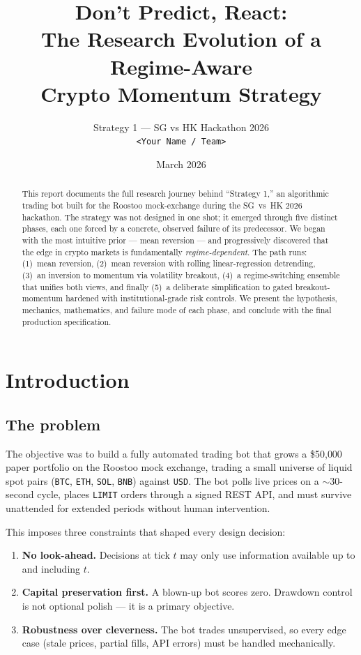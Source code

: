 \documentclass[11pt,a4paper]{article}
\title{\textbf{Don't Predict, React:}\\[2pt]
       \large The Research Evolution of a Regime-Aware\\ Crypto Momentum Strategy}
\author{Strategy 1 --- SG vs HK Hackathon 2026\\[2pt]
        \small \texttt{<Your Name / Team>}}
\date{March 2026}
\newcommand{\code}[1]{\texttt{#1}}
\begin{document}
\maketitle

\begin{abstract}
\noindent
This report documents the full research journey behind ``Strategy 1,'' an
algorithmic trading bot built for the Roostoo mock-exchange during the SG~vs~HK
2026 hackathon. The strategy was not designed in one shot; it emerged through
five distinct phases, each one forced by a concrete, observed failure of its
predecessor. We began with the most intuitive prior --- mean reversion --- and
progressively discovered that the edge in crypto markets is fundamentally
\emph{regime-dependent}. The path runs: (1)~mean reversion, (2)~mean reversion
with rolling linear-regression detrending, (3)~an inversion to momentum via
volatility breakout, (4)~a regime-switching ensemble that unifies both views,
and finally (5)~a deliberate simplification to gated breakout-momentum hardened
with institutional-grade risk controls. We present the hypothesis, mechanics,
mathematics, and failure mode of each phase, and conclude with the final
production specification.
\end{abstract}

\tableofcontents
\bigskip

\section{Introduction}

\subsection{The problem}
The objective was to build a fully automated trading bot that grows a
\$50{,}000 paper portfolio on the Roostoo mock exchange, trading a small
universe of liquid spot pairs (\code{BTC}, \code{ETH}, \code{SOL}, \code{BNB})
against \code{USD}. The bot polls live prices on a $\sim$30-second cycle, places
\code{LIMIT} orders through a signed REST API, and must survive unattended for
extended periods without human intervention.

This imposes three constraints that shaped every design decision:
\begin{enumerate}[noitemsep]
  \item \textbf{No look-ahead.} Decisions at tick $t$ may only use information
        available up to and including $t$.
  \item \textbf{Capital preservation first.} A blown-up bot scores zero. Drawdown
        control is not optional polish --- it is a primary objective.
  \item \textbf{Robustness over cleverness.} The bot trades unsupervised, so every
        edge case (stale prices, partial fills, API errors) must be handled
        mechanically.
\end{enumerate}
\end{document}
